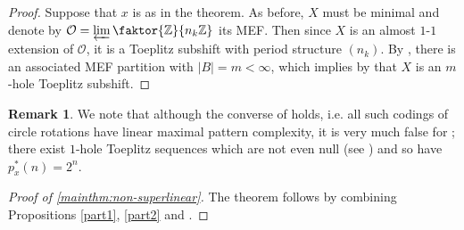 \documentclass[11pt,reqno]{amsart}
\theoremstyle{definition}
\newtheorem{remark}[theorem]{Remark}
\theoremstyle{plain}
\newcommand{\Z}{\mathbb{Z}}
\newcommand{\N}{\mathbb{N}}
\begin{document}
\begin{proof}
Suppose that $x$ is as in the theorem. As before, $X$ must be minimal and denote by $\mathcal{O} = \varprojlim \faktor{\Z}{n_k\Z}$ its MEF. Then since $X$ is an almost $1$-$1$ extension of $\mathcal{O}$, it is a Toeplitz subshift with period structure $(n_k)$. By , there is an associated MEF partition with $|B| = m < \infty$, which implies by  that $X$ is an $m$-hole Toeplitz subshift.





\end{proof}

\begin{remark}
We note that although the converse of  holds, i.e. all such codings of circle rotations have linear maximal pattern complexity, it is very much false for ; there exist $1$-hole Toeplitz sequences which are not even null (see \cite[Section 11]{Kerr_Li-independence_Cstar}) and so have $p^*_x(n) = 2^n$.
\end{remark}

\begin{proof}[Proof of \cref{mainthm:non-superlinear}]
The theorem follows by combining Propositions \ref{part1}, \ref{part2} and .
\end{proof}
\end{document}
